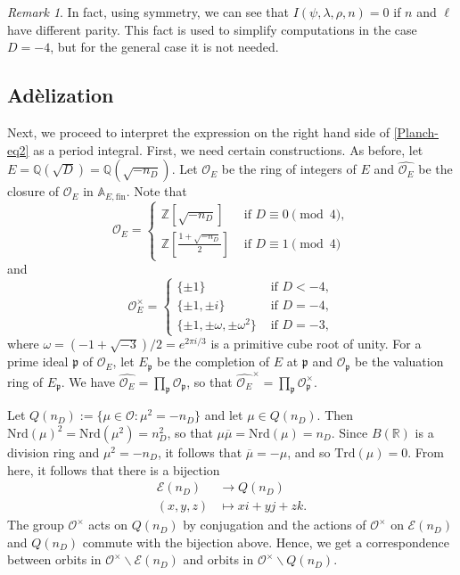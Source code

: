 \documentclass[11pt]{amsart}
\newcommand{\bigo}{\mathcal{O}}
\newcommand{\R}{\mathbb{R}}
\newcommand{\Z}{\mathbb{Z}}
\newcommand{\Q}{\mathbb{Q}}
\newcommand{\A}{\mathbb{A}}
\newcommand{\p}{\mathfrak{p}}
\newcommand{\trd}[1]{\mathrm{Trd}\left(#1\right)}
\newcommand{\nrd}[1]{\mathrm{Nrd}\left(#1\right)}
\theoremstyle{definition}
\theoremstyle{remark}
\newtheorem{remark}[theorem]{Remark}
\begin{document}
\begin{remark}\label{ParityObs}
In fact, using symmetry, we can see that $I(\psi,\lambda, \rho, n)=0$ if $n$ and $\ell$ have different parity. This fact is used to simplify computations in the case $D=-4$, but for the general case it is not needed.
\end{remark}




\subsection{Adèlization}\label{Adelization}

Next, we proceed to interpret the expression on the right hand side of \eqref{Planch-eq2} as a period integral. First, we need certain constructions. As before, let $E=\Q(\sqrt{D}) = \Q(\sqrt{-n_D})$. Let $\bigo_E$ be the ring of integers of $E$ and $\widehat{\bigo_E}$ be the closure of $\bigo_E$ in $\A_{E,\text{fin}}$. Note that $$\bigo_E = \left\{ \begin{array}{ll}
    \Z[\sqrt{-n_D}] & \text{ if } D\equiv 0 \pmod{4}, \\
    \Z\left[ \frac{1+\sqrt{-n_D}}{2} \right] & \text{ if } D \equiv 1 \pmod{4}
\end{array} \right.$$ and $$\bigo_{E}^{\times} = \left\{ \begin{array}{ll}
    \{\pm 1\} & \text{ if } D<-4, \\
    \{\pm 1, \pm i\} & \text{ if } D=-4, \\
    \{\pm 1, \pm \omega, \pm \omega^2\} & \text{ if } D=-3,
\end{array} \right.$$ where $\omega = (-1+\sqrt{-3})/2 = e^{2\pi i/3}$ is a primitive cube root of unity. For a prime ideal $\p$ of $\bigo_E$, let $E_{\p}$ be the completion of $E$ at $\p$ and $\bigo_{\p}$ be the valuation ring of $E_{\p}$. We have $\widehat{\bigo_{E}} = \prod_{\p} \bigo_{\p}$, so that $\widehat{\bigo_{E}}^{\times} = \prod_{\p} \bigo_{\p}^{\times}$.

Let $Q(n_D) := \{\mu \in \bigo : \mu^2 = -n_D\}$ and let $\mu \in Q(n_D)$. Then $\nrd{\mu}^2 = \nrd{\mu^2} = n_D^2$, so that $\mu \overline{\mu} = \nrd{\mu} = n_D$. Since $B(\R)$ is a division ring and $\mu^2=-n_D$, it follows that $\overline{\mu} = -\mu$, and so $\trd{\mu}=0$. From here, it follows that there is a bijection
\begin{align*}
    \mathcal{E}(n_D) &\longrightarrow Q(n_D) \\ 
    (x,y,z) &\longmapsto xi + yj + zk.
\end{align*}
The group $\bigo^{\times}$ acts on $Q(n_D)$ by conjugation and the actions of $\bigo^{\times}$ on $\mathcal{E}(n_D)$ and $Q(n_D)$ commute with the bijection above. Hence, we get a correspondence between orbits in $\bigo^{\times} \backslash \mathcal{E}(n_D)$ and orbits in $\bigo^{\times} \backslash Q(n_D)$.
\end{document}
